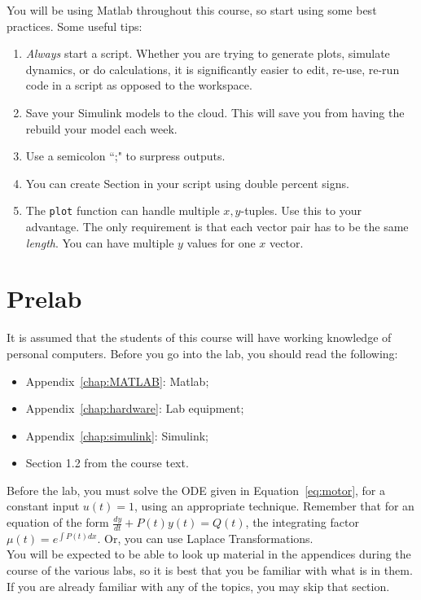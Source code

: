 \noindent You will be using Matlab throughout this course, so start using some best practices. Some useful tips:
\begin{enumerate}
\item \emph{Always} start a script. Whether you are trying to generate plots, simulate dynamics, or do calculations, it is significantly easier to edit, re-use, re-run code in a script as opposed to the workspace.
\item Save your Simulink models to the cloud. This will save you from having the rebuild your model each week.
\item Use a semicolon ``;" to surpress outputs.
\item You can create Section in your script using double percent signs.
\item The \verb|plot| function can handle multiple $x,y$-tuples. Use this to your advantage. The only requirement is that each vector pair has to be the same \emph{length}. You can have multiple $y$ values for one $x$ vector.
\end{enumerate}
\section{Prelab}

It is assumed that the students of this course will have working knowledge of
personal computers. Before you go into the lab, you should read the
following:
\begin{itemize}
\item Appendix~\ref{chap:MATLAB}\@: \textsf{Matlab}\@;
\item Appendix~\ref{chap:hardware}\@: Lab equipment;
\item Appendix~\ref{chap:simulink}\@: \textsf{Simulink}\@;
\item Section 1.2 from the course text.
\end{itemize}

\noindent Before the lab, you must solve the ODE given in Equation~\ref{eq:motor}, for a constant input $u(t)=1$, using an appropriate technique. 
Remember that for an equation of the form $\frac{dy}{dt} + P(t)y(t) = Q(t)$, the integrating factor $\mu(t) = e^{\int P(t)dx}$. Or, you can use Laplace Transformations.\\

\noindent You will be expected to be able to look up material in the appendices during
the course of the various labs, so it is best that you be familiar with what
is in them.  If you are already familiar with any of the topics, you may skip
that section.

